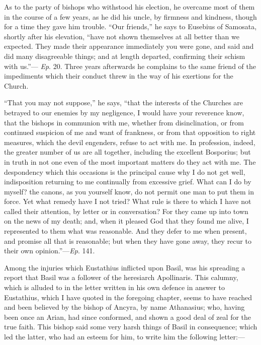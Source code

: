 As to the party of bishops who withstood his election, he overcame
most of them in the course of a few years, as he did his uncle, by
firmness and kindness, though for a time they gave him trouble.
``Our friends,'' he says to Eusebius of Samosata, shortly
after his elevation, ``have not shown themselves at all better
than we expected. They made their appearance immediately you were
gone, and said and did many disagreeable things; and at length
departed, confirming their schism with us.''— \emph{Ep}. 20.
Three years afterwards he complains to the same friend of the
impediments which their conduct threw in the way of his exertions for
the Church.

``That you may not suppose,'' he says, ``that the
interests of the Churches are betrayed to our enemies by my
negligence, I would have your reverence know, that the bishops in
communion with me, whether from disinclination, or from continued
suspicion of me and want of frankness, or from that opposition to
right measures, which the devil engenders, refuse to act with me. In
profession, indeed, the greater number of us are all together,
including the excellent Bosporius; but in truth in not one even of the
most important matters do they act with me. The despondency which this
occasions is the principal cause why I do not get well, indisposition
returning to me continually from excessive grief. What can I do by
myself? the canons, as you yourself know, do not permit one man to put
them in force. Yet what remedy have I not tried? What rule is there to
which I have not called their attention, by letter or in conversation?
For they came up into town on the news of my death; and, when it
pleased God that they found me alive, I represented to them what was
reasonable. And they defer to me when present, and promise all that is
reasonable; but when they have gone away, they recur to their own
opinion.''—\emph{Ep}. 141.

Among the injuries which Eustathius inflicted upon Basil, was his
spreading a report that Basil was a follower of the heresiarch
Apollinaris. This calumny, which is alluded to in the letter written
in his own defence in answer to Eustathius, which I have quoted in the
foregoing chapter, seems to have reached and been believed by the
bishop of Ancyra, by name Athanasius; who, having been once an Arian,
had since conformed, and shown a good deal of zeal for the true faith.
This bishop said some very harsh things of Basil in consequence; which
led the latter, who had an esteem for him, to write him the following
letter:—

